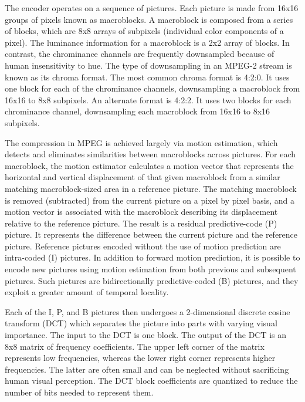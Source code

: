 The encoder operates on a sequence of pictures. Each picture is made
from 16x16 groups of pixels known as macroblocks.  A macroblock is
composed from a series of blocks, which are 8x8 arrays of subpixels
(individual color components of a pixel). The luminance information
for a macroblock is a 2x2 array of blocks. In contrast, the
chrominance channels are frequently downsampled because of human
insensitivity to hue. The type of downsampling in an MPEG-2 stream is
known as its chroma format. The most common chroma format is 4:2:0. It
uses one block for each of the chrominance channels, downsampling a
macroblock from 16x16 to 8x8 subpixels. An alternate format is
4:2:2. It uses two blocks for each chrominance channel, downsampling
each macroblock from 16x16 to 8x16 subpixels.

The compression in MPEG is achieved largely via motion estimation,
which detects and eliminates similarities between macroblocks across
pictures. For each macroblock, the motion estimator calculates a motion
vector that represents the horizontal and vertical displacement of that 
given macroblock from a similar matching
macroblock-sized area in a reference picture.  The matching macroblock
is removed (subtracted) from the current picture on a pixel by pixel
basis, and a motion vector is associated with the macroblock
describing its displacement relative to the reference picture. The
result is a residual predictive-code (P) picture. It represents the
difference between the current picture and the reference
picture. Reference pictures encoded without the use of motion
prediction are intra-coded (I) pictures. In addition to forward motion
prediction, it is possible to encode new pictures using motion
estimation from both previous and subsequent pictures. Such pictures
are bidirectionally predictive-coded (B) pictures, and they exploit a
greater amount of temporal locality.

Each of the I, P, and B pictures then undergoes a 2-dimensional
discrete cosine transform (DCT) which separates the picture into parts
with varying visual importance. The input to the DCT is one block.
The output of the
DCT is an 8x8 matrix of frequency coefficients. The upper left corner
of the matrix represents low frequencies, whereas the lower right
corner represents higher frequencies. The latter are often small and
can be neglected without sacrificing human visual perception. The DCT 
block coefficients are quantized to reduce the number of bits needed
to represent them. 

